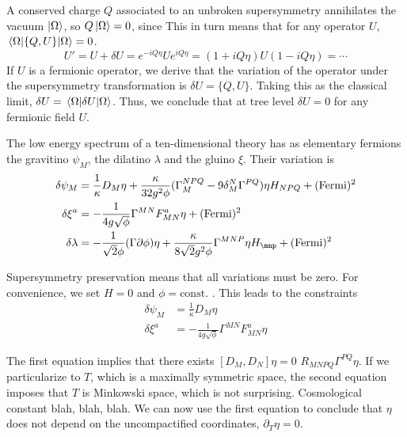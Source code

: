 A conserved charge $Q$ associated to an unbroken supersymmetry annihilates the vacuum $\ket{\Omega}$,
so $Q\ket{\Omega}=0$, since
This in turn means that for any operator $U$, $\ev{ \{Q,U\} }{\Omega}=0$.
\begin{equation}
  U' = U+\delta U = e^{-iQ\eta} U e^{iQ\eta} = (1 + iQ\eta) U (1- iQ\eta) = \cdots
\end{equation}
If $U$ is a fermionic operator, we derive that the variation of the operator under the supersymmetry
transformation is $\delta U = \{ Q, U\}$.
Taking this as the classical limit, $\delta U = \ev{\delta U}{\Omega}$.
Thus, we conclude that at tree level $\delta U = 0$ for any fermionic field $U$.

The low energy spectrum of a ten-dimensional theory has as elementary fermions the gravitino $\psi_M$,
the dilatino $\lambda$ and the gluino $\xi$.
Their variation is
\begin{equation}
  \begin{align}
  \delta \psi_M &= \frac{1}{\kappa }D_M \eta + \frac{\kappa}{32g^2 \phi}(\Gamma_M^{NPQ} - 9\delta^N_M \Gamma^{PQ})\eta H_{NPQ} + (\mathrm{Fermi})^2 \\
  \delta \xi^a &= -\frac{1}{4g\sqrt \phi} \Gamma^{MN} F^a_{MN} \eta + (\mathrm{Fermi})^2 \\
  \delta \lambda &=- \frac{1}{\sqrt 2 \phi}(\Gamma \partial \phi)\eta + \frac{\kappa}{8\sqrt 2 g^2 \phi} \Gamma^{MNP} \eta H_{\mnp} + (\mathrm{Fermi})^2
  \end{align}
\end{equation}

Supersymmetry preservation means that all variations must be zero. 
For convenience, we set $H=0$ and $\phi=\mathrm{const.}$ .
This leads to the constraints
\begin{equation}
  \begin{align}
  \delta \psi_M &= \frac{1}{\kappa }D_M \eta\\ 
  \delta \xi^a &= -\frac{1}{4g\sqrt \phi} \Gamma^{MN} F^a_{MN} \eta 
  \end{align}
\end{equation}

The first equation implies that there exists $[D_M,D_N]\eta=0$ $R_{MNPQ} \Gamma^{PQ} \eta$.
If we particularize to $T$, which is a maximally symmetric space, the second equation imposes that
$T$ is Minkowski space, which is not surprising.
Cosmological constant blah, blah, blah.
We can now use the first equation to conclude that $\eta$ does not depend on the uncompactified 
coordinates,  $\partial_T \eta=0$.

